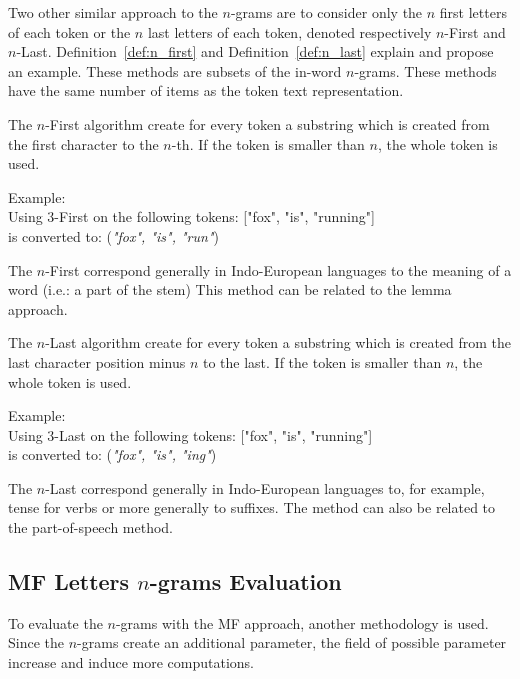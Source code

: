 Two other similar approach to the $n$-grams are to consider only the $n$ first letters of each token or the $n$ last letters of each token, denoted respectively $n$-First and $n$-Last.
Definition~\ref{def:n_first} and Definition~\ref{def:n_last} explain and propose an example.
These methods are subsets of the in-word $n$-grams.
These methods have the same number of items as the token text representation.

\begin{definition}
  The $n$-First algorithm create for every token a substring which is created from the first character to the $n$-th.
  If the token is smaller than $n$, the whole token is used.

  Example: \\
  Using $3$-First on the following tokens: ["fox", "is", "running"] \\
  is converted to: (\textit{"fox", "is", "run"})
\end{definition}

The $n$-First correspond generally in Indo-European languages to the meaning of a word (i.e.: a part of the stem)
This method can be related to the lemma approach.

\begin{definition}[$n$-Last]
  \label{def:n_last}
  The $n$-Last algorithm create for every token a substring which is created from the last character position minus $n$ to the last.
  If the token is smaller than $n$, the whole token is used.

  Example: \\
  Using $3$-Last on the following tokens: ["fox", "is", "running"] \\
  is converted to: (\textit{"fox", "is", "ing"})
\end{definition}

The $n$-Last correspond generally in Indo-European languages to, for example, tense for verbs or more generally to suffixes.
The method can also be related to the part-of-speech method.

\subsection{MF Letters $n$-grams Evaluation}

To evaluate the $n$-grams with the MF approach, another methodology is used.
Since the $n$-grams create an additional parameter, the field of possible parameter increase and induce more computations.

